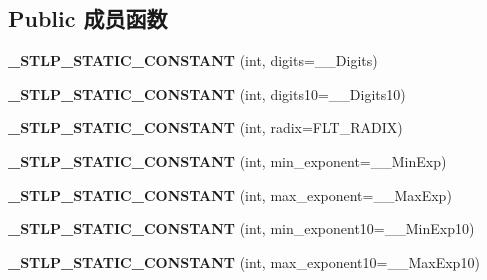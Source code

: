 \subsection*{Public 成员函数}
\begin{DoxyCompactItemize}
\item 
\mbox{\label{class___floating__limits_ac7e4d334b4159e18d0bdd42f37b63b85}} 
{\bfseries \+\_\+\+S\+T\+L\+P\+\_\+\+S\+T\+A\+T\+I\+C\+\_\+\+C\+O\+N\+S\+T\+A\+NT} (int, digits=\+\_\+\+\_\+\+Digits)
\item 
\mbox{\label{class___floating__limits_a2de510bf8cd6485a715d87ba655188b3}} 
{\bfseries \+\_\+\+S\+T\+L\+P\+\_\+\+S\+T\+A\+T\+I\+C\+\_\+\+C\+O\+N\+S\+T\+A\+NT} (int, digits10=\+\_\+\+\_\+\+Digits10)
\item 
\mbox{\label{class___floating__limits_afc00783b40cc1f0be9b90d7fd6cb369c}} 
{\bfseries \+\_\+\+S\+T\+L\+P\+\_\+\+S\+T\+A\+T\+I\+C\+\_\+\+C\+O\+N\+S\+T\+A\+NT} (int, radix=F\+L\+T\+\_\+\+R\+A\+D\+IX)
\item 
\mbox{\label{class___floating__limits_a42171146e0211d4cec1d48343d5752e7}} 
{\bfseries \+\_\+\+S\+T\+L\+P\+\_\+\+S\+T\+A\+T\+I\+C\+\_\+\+C\+O\+N\+S\+T\+A\+NT} (int, min\+\_\+exponent=\+\_\+\+\_\+\+Min\+Exp)
\item 
\mbox{\label{class___floating__limits_a0b6f363e93848d6d75b23894d88c8f08}} 
{\bfseries \+\_\+\+S\+T\+L\+P\+\_\+\+S\+T\+A\+T\+I\+C\+\_\+\+C\+O\+N\+S\+T\+A\+NT} (int, max\+\_\+exponent=\+\_\+\+\_\+\+Max\+Exp)
\item 
\mbox{\label{class___floating__limits_a6c12d1dfeed64558d7719a325b7e970b}} 
{\bfseries \+\_\+\+S\+T\+L\+P\+\_\+\+S\+T\+A\+T\+I\+C\+\_\+\+C\+O\+N\+S\+T\+A\+NT} (int, min\+\_\+exponent10=\+\_\+\+\_\+\+Min\+Exp10)
\item 
\mbox{\label{class___floating__limits_a909af2e310cd1d6112998f652e24e43f}} 
{\bfseries \+\_\+\+S\+T\+L\+P\+\_\+\+S\+T\+A\+T\+I\+C\+\_\+\+C\+O\+N\+S\+T\+A\+NT} (int, max\+\_\+exponent10=\+\_\+\+\_\+\+Max\+Exp10)
\item 
\mbox{\label{class___floating__limits_a83e9a6c61c276ff8a3e5abc52f64d930}} 

\end{DoxyCompactItemize}
